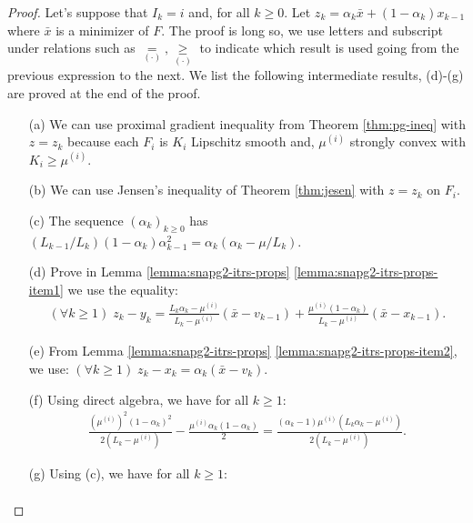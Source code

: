 \documentclass[12pt]{article}
\begin{document}
    \begin{proof}
        Let's suppose that $I_k = i$ and, for all $k \ge 0$. 
        Let $z_k = \alpha_k \bar x + (1 - \alpha_k)x_{k - 1}$ where $\bar x$ is a minimizer of $F$. 
        The proof is long so, we use letters and subscript under relations such as $\underset{(\cdot)}{=}, \underset{(\cdot)}{\ge}$ to indicate which result is used going from the previous expression to the next. 
        We list the following intermediate results, (d)-(g) are proved at the end of the proof. 
        \begin{itemize}
            \item[(a)] We can use proximal gradient inequality from Theorem \ref{thm:pg-ineq} with $z = z_k$ because each $F_i$ is $K_i$ Lipschitz smooth and, $\mu^{(i)}$ strongly convex with $K_i \ge \mu^{(i)}$. 
            \item[(b)] We can use Jensen's inequality of Theorem \ref{thm:jesen} with $z = z_k$ on $F_i$. 
            \item[(c)] The sequence $(\alpha_k)_{k \ge 0}$ has $(L_{k - 1}/L_k)(1 - \alpha_{k})\alpha_{k - 1}^2 = \alpha_{k}\left(\alpha_{k} - \mu/L_k\right)$. 
            \item[(d)] Prove in Lemma \ref{lemma:snapg2-itrs-props} \ref{lemma:snapg2-itrs-props-item1} we use the equality:
            \begin{align*}
                (\forall k \ge 1)\; 
                z_k - y_k 
                = 
                \frac{L_k\alpha_k - \mu^{(i)}}{L_k - \mu^{(i)}}(\bar x - v_{k - 1})
                + \frac{\mu^{(i)}(1 - \alpha_k)}{L_k - \mu^{(i)}}(\bar x - x_{k - 1}).
            \end{align*}
            \item [(e)] From Lemma \ref{lemma:snapg2-itrs-props} \ref{lemma:snapg2-itrs-props-item2}, we use: $(\forall k \ge 1)\; z_k - x_k = \alpha_k (\bar x - v_k)$. 
            \item [(f)] Using direct algebra, we have for all $k \ge 1$: 
            \begin{align*}
                \frac{\left(\mu^{(i)}\right)^2(1 - \alpha_k)^2}{2(L_k - \mu^{(i)})} 
                - \frac{\mu^{(i)}\alpha_k(1 - \alpha_k)}{2}
                = \frac{(\alpha_k - 1)\mu^{(i)}\left(L_k\alpha_k - \mu^{(i)}\right)}
                {2\left(L_k - \mu^{(i)}\right)}. 
            \end{align*}
            \item [(g)] Using (c), we have for all $k \ge 1$: 
            \begin{align*}

\end{align*}
\end{itemize}
\end{proof}
\end{document}

